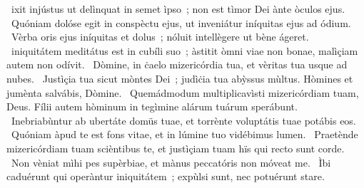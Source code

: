 \psalmChapterWithInscription{}
{ }
{%
~ixit injústus ut delìnquat in semet ìpso~; non est tìmor Dei ànte òculos ejus. 
~Quóniam dolóse egit in conspèctu ejus, ut inveniátur iníquitas ejus ad ódium. 
~Vèrba oris ejus iníquitas et dolus~; nóluit intellègere ut bène ágeret. 
~iniquitátem meditátus est in cubíli suo~; àstitit òmni viae non bonae, malìçiam autem non odívit. 
~Dòmine, in ċaelo mizericórdia tua, et vèritas tua usque ad nubes. 
~Justìçia tua sicut mòntes Dei~; judìċia tua abỳssus mùltus. Hòmines et jumènta salvábis, Dòmine. 
~Quemádmodum multiplicavìsti mizericórdiam tuam, Deus. Fílii autem hòminum in tegìmine alárum tuárum sperábunt. 
~Inebriabùntur ab ubertáte domüs tuae, et torrènte voluptátis tuae potábis eos. 
~Quóniam àpud te est fons vitae, et in lúmine tuo vidébimus lumen. 
~Praetènde mizericórdiam tuam scièntibus te, et justìçiam tuam hïs qui recto sunt corde. 
~Non vèniat mìhi pes supèrbiae, et mànus peccatóris non móveat me. 
~Ìbi caduérunt qui operàntur iniquitátem~; expùlsi sunt, nec potuérunt stare. 
}
